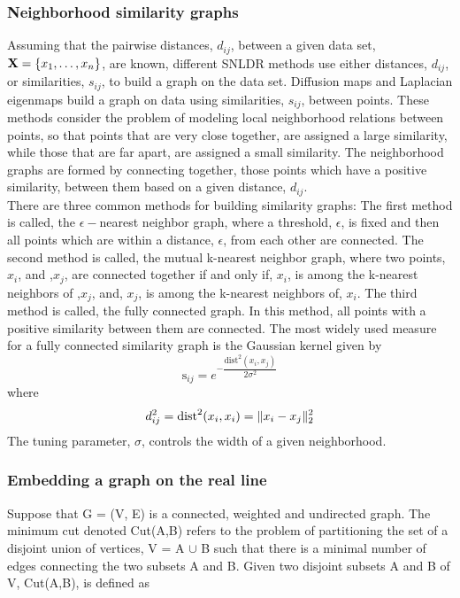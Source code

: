 \subsubsection{Neighborhood similarity graphs}
Assuming that the pairwise distances, $d_{ij}$, between a given data set, 
$ \textbf{X} = \{x_{1}, \ldots, x_{n}\}$, are known, different SNLDR methods
use either distances, $d_{ij}$, or similarities, $s_{ij}$, to build a graph 
on the data set. Diffusion maps and Laplacian eigenmaps build a graph on data using similarities, $s_{ij}$, between points.
These methods consider the problem of modeling local neighborhood relations
between points, so that points that are very close together, are assigned a large similarity, while those that are far apart, are assigned a small similarity.
The neighborhood graphs are formed by connecting together, those points which have a positive similarity, between them based on a given distance, $d_{ij}$.\\

There are three common methods for building similarity graphs:
The first method is called, the $\epsilon-$nearest neighbor graph, where a threshold, $\epsilon$, is fixed and then  all points which are within a distance, $\epsilon$, from each other are connected. The second method is called, the mutual k-nearest neighbor graph, where two points, $x_{i}$, and ,$x_{j}$, are connected together if and only if, $x_{i}$,  is among the k-nearest neighbors of ,$x_{j}$, and, $x_{j}$, is among the k-nearest neighbors of, $x_{i}$.
The third method is called, the fully connected graph. In this method, all 
points with a positive similarity between them are connected.
The most widely used measure for a fully connected similarity graph is the Gaussian kernel given by 
\[
\text{s}_{ij} = e^{-\dfrac{\text{dist}^{2}(x_{i}, x_{j})}{2 \sigma^2 } } 
\]
where
\[
d_{ij}^{2} = \text{dist}^{2}(x_{i}, x_{i}) = \lVert x_{i}-x_{j}\rVert_{2}^{2}
\]
The tuning parameter, $\sigma$, controls the width of a given neighborhood.



\subsubsection{Embedding a graph on the real line}
Suppose that G = (V, E) is a connected, weighted and undirected graph.
The minimum cut denoted Cut(A,B) refers to the problem of partitioning the set of a disjoint union of vertices, V = A $\displaystyle \cup$ B  such that there is a minimal number of edges connecting the two subsets A and B.
Given two disjoint subsets A and B of V, Cut(A,B), is defined as

